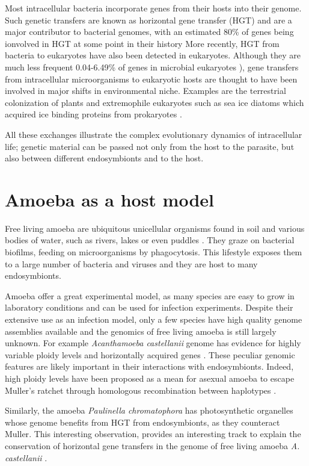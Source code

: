 Most intracellular bacteria incorporate genes from their hosts into their genome. Such genetic transfers are known as horizontal gene transfer (HGT) and are a major contributor to bacterial genomes, with an estimated 80\% of genes being ionvolved in HGT at some point in their history \cite{Dagan2008} More recently, HGT from bacteria to eukaryotes have also been detected in eukaryotes. Although they are much less frequent 0.04-6.49\% of genes in microbial eukaryotes \cite{VanEtten2020}), gene transfers from intracellular microorganisms to eukaryotic hosts are thought to have been involved in major shifts in environmental niche. Examples are the terrestrial colonization of plants and extremophile eukaryotes such as sea ice diatoms which acquired ice binding proteins from prokaryotes \cite{VanEtten2020}.

All these exchanges illustrate the complex evolutionary dynamics of intracellular life; genetic material can be passed not only from the host to the parasite, but also between different endosymbionts and to the host.

\section{Amoeba as a host model}

Free living amoeba are ubiquitous unicellular organisms found in soil and various bodies of water, such as rivers, lakes \cite{John1995} or even puddles \cite{Sakamoto2009}. They graze on bacterial biofilms, feeding on microorganisms by phagocytosis. This lifestyle exposes them to a large number of bacteria and viruses and they are host to many endosymbionts. 

Amoeba offer a great experimental model, as many species are easy to grow in laboratory conditions and can be used for infection experiments. Despite their extensive use as an infection model, only a few species have high quality genome assemblies available and the genomics of free living amoeba is still largely unknown. For example \textit{Acanthamoeba castellanii} genome has evidence for highly variable ploidy levels \cite{Maciver2016} and horizontally acquired genes \cite{clarke2013}. These peculiar genomic features are likely important in their interactions with endosymbionts. Indeed, high ploidy levels have been proposed as a mean for asexual amoeba to escape Muller's ratchet through homologous recombination between haplotypes \cite{Maciver2016}.

Similarly, the amoeba \textit{Paulinella chromatophora} has photosynthetic organelles whose genome benefits from HGT from endosymbionts, as they counteract \Gls{Muller}. This interesting observation, provides an interesting track to explain the conservation of horizontal gene transfers in the genome of free living amoeba \textit{A. castellanii} \cite{clarke2013}.

